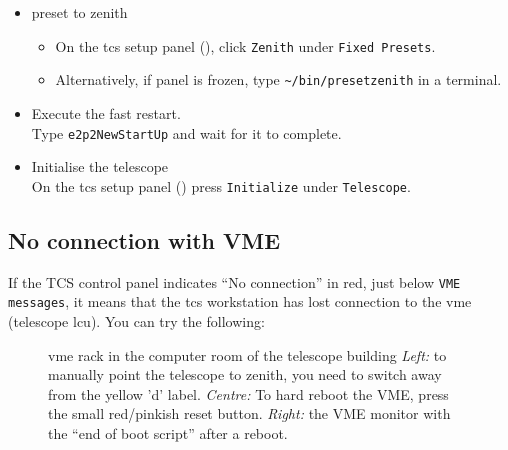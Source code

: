 \documentclass[11pt,fleqn,a4paper]{book}
\def\home{\textasciitilde{}}
\begin{document}
\begin{itemize}
 \item \gls{preset} to zenith
    \begin{itemize}
	\item On the \gls{tcs} setup panel (), click \texttt{Zenith} under \texttt{Fixed Presets}.
        \item Alternatively, if panel is frozen, type \texttt{\home/bin/presetzenith} in a terminal.
    \end{itemize}
 \item Execute the fast restart.\\
       Type \texttt{e2p2NewStartUp} and wait for it to complete.
 \item Initialise the telescope\\
       On the \gls{tcs} setup panel () press \texttt{Initialize} under \texttt{Telescope}.
\end{itemize}

\subsection{No connection with VME}
If the \gls{TCS control panel} indicates ``No connection'' in red, just below \texttt{VME messages}, it means that the \gls{tcs} workstation has lost connection to the \gls{vme} (telescope \gls{lcu}). You can try the following:

\begin{figure}
\centering
{}%
\caption[VME rack in the computer room of the telescope building]{\gls{vme} rack in the \gls{computer room} of the telescope building 
\emph{Left:} to
manually point the telescope to zenith, you need to switch away from 
the yellow 'd' label. \emph{Centre:} To hard reboot the VME, press the small red/pinkish reset button. \emph{Right:} the VME monitor with the ``end of boot script'' after a reboot.}
\end{figure}
\end{document}
